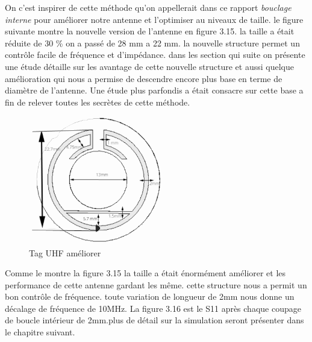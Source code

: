 \documentclass[11pt, a4paper, twoside]{book}
\begin{document}
On c'est inspirer de cette méthode qu'on appellerait dans ce rapport \emph{bouclage interne} pour améliorer notre antenne et l'optimiser au niveaux de taille. le figure suivante montre la nouvelle version de l'antenne en figure 3.15. la taille a était réduite de 30 \% on a passé de 28 mm a 22 mm. la nouvelle structure permet un contrôle facile de fréquence et d'impédance. dans les section qui suite on présente une étude détaille sur les avantage de cette nouvelle structure et aussi quelque amélioration qui nous a permise de descendre encore plus base en terme de diamètre de l'antenne. Une étude plus parfondis a était consacre sur cette base a fin de relever toutes les secrètes de cette méthode.\\

\begin{figure}[H]
\centering
\includegraphics[width=6cm]{1STee}
\caption{Tag UHF améliorer}
\end{figure}
Comme le montre la figure 3.15 la taille a était énormément améliorer et les performance de cette antenne gardant les même. cette structure nous a permit un bon contrôle de fréquence. toute variation de longueur de 2mm nous donne un décalage de fréquence de 10MHz. La figure 3.16 est le S11 après chaque coupage de boucle intérieur de 2mm.plus de détail sur la simulation seront présenter dans le chapitre suivant.\\
\end{document}
